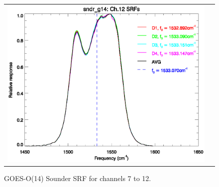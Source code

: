 \begin{figure}[htp]
\begin{tabular}{c c}
    \includegraphics[scale=0.5]{graphics/nominal/sndr_g14.ch12.srf.eps}
  \end{tabular}
  \caption{GOES-O(14) Sounder SRF for channels 7 to 12.}
  \label{fig:sndr_g14.ch7-12}
\end{figure}

